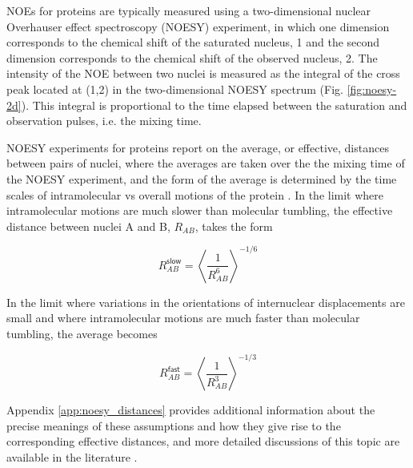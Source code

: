 \documentclass[9pt,review]{livecoms}
\begin{document}
NOEs for proteins are typically measured using a two-dimensional nuclear Overhauser effect spectroscopy (NOESY) experiment, in which one dimension corresponds to the chemical shift of the saturated nucleus, 1 and the second dimension corresponds to the chemical shift of the observed nucleus, 2.
The intensity of the NOE between two nuclei is measured as the integral of the cross peak located at (1,2) in the two-dimensional NOESY spectrum (Fig. \ref{fig:noesy-2d}).
This integral is proportional to the time elapsed between the saturation and observation pulses, i.e. the mixing time.

NOESY experiments for proteins report on the average, or effective, distances between pairs of nuclei, where the averages are taken over the the mixing time of the NOESY experiment, and the form of the average is determined by the time scales of intramolecular vs overall motions of the protein \cite{neuhaus_nuclear_2000,vogeli_nuclear_2014}.
In the limit where intramolecular motions are much slower than molecular tumbling, the effective distance between nuclei A and B, $R_{AB}$, takes the form

\begin{equation}
\label{eqn:noe_R_slow}
R_{AB}^{\mathsf{slow}} = \left \langle \frac {1} {R_{AB}^6} \right \rangle^{-1/6}
\end{equation}

\noindent In the limit where variations in the orientations of internuclear displacements are small and where intramolecular motions are much faster than molecular tumbling, the average becomes 

\begin{equation}
\label{eqn:noe_R_fast}
R_{AB}^{\mathsf{fast}} = \left \langle \frac {1} {R_{AB}^3} \right \rangle^{-1/3}
\end{equation}

\noindent Appendix \ref{app:noesy_distances} provides additional information about the precise meanings of these assumptions and how they give rise to the corresponding effective distances, and more detailed discussions of this topic are available in the literature \cite{neuhaus_nuclear_2000,vogeli_nuclear_2014}.
\end{document}
